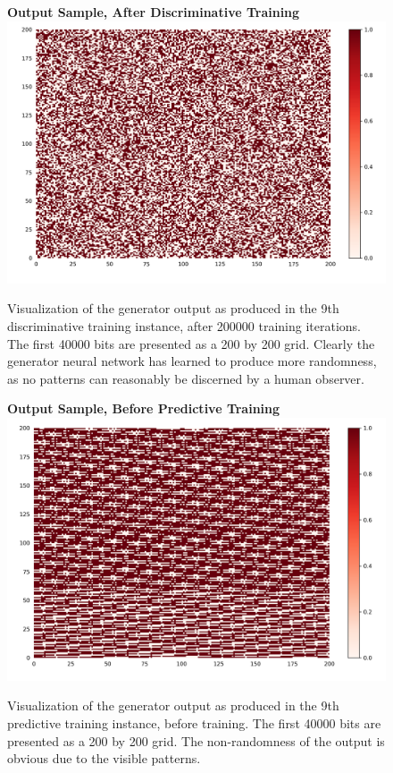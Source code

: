 \documentclass[12pt, titlepage]{report}
\theoremstyle{definition}
\begin{document}
\begin{figure}
\centering
\textbf{Output Sample, After Discriminative Training}
\includegraphics[width=1\textwidth]{img/discriminative_after}\\
\caption{Visualization of the generator output as produced in the 9th discriminative training instance, after 200000 training iterations. The first 40000 bits are presented as a 200 by 200 grid. Clearly the generator neural network has learned to produce more randomness, as no patterns can reasonably be discerned by a human observer.}
\label{figure:visualize_discriminative_after}
\end{figure}

\begin{figure}
\centering
\textbf{Output Sample, Before Predictive Training}
\includegraphics[width=1\textwidth]{img/predictive_before}\\
\caption{Visualization of the generator output as produced in the 9th predictive training instance, before training. The first 40000 bits are presented as a 200 by 200 grid. The non-randomness of the output is obvious due to the visible patterns.}
\label{figure:visualize_predictive_before}
\end{figure}
\end{document}
